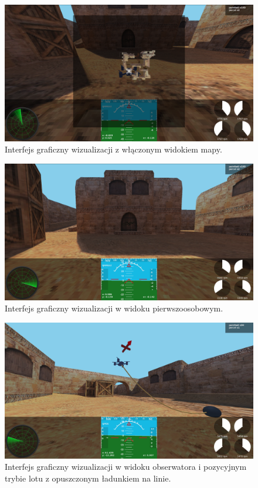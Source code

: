 \documentclass[15pt]{sprawozdanie}
\begin{document}
\begin{figure}[!h]
	\centering
	\includegraphics[width=1\textwidth]{game_view_map.png}
	\caption{Interfejs graficzny wizualizacji z włączonym widokiem mapy.}
	\label{gui_game2}
\end{figure}

\newpage
\begin{figure}[!h]
	\centering
	\includegraphics[width=1\textwidth]{game_view_fpp.png}
	\caption{Interfejs graficzny wizualizacji w widoku pierwszoosobowym.}
	\label{gui_game3}
\end{figure}

\begin{figure}[!h]
	\centering
	\includegraphics[width=1\textwidth]{game_view_rope.png}
	\caption{Interfejs graficzny wizualizacji w widoku obserwatora i pozycyjnym trybie lotu z opuszczonym ładunkiem na linie.}
	\label{gui_game4}
\end{figure}
\end{document}
